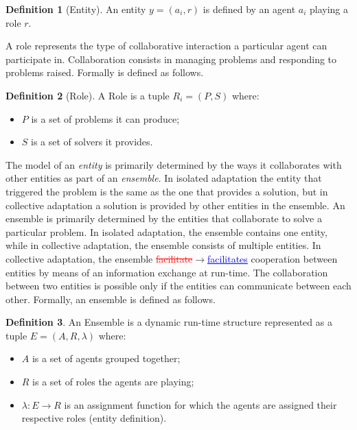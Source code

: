 \documentclass[journal]{IEEEtran}
\theoremstyle{definition}
\newtheorem{definition}{Definition}
\newcommand{\ra}{$\rightarrow$}
\newcommand{\chg}[2]{\textcolor{red}{\sout{#1}}{\ra}\textcolor{blue}{\uline{#2}}} %
\begin{document}
\begin{definition} [Entity] An entity $y = (a_i, r)$ is defined by an agent $a_i$ playing a role $r$.
\end{definition}

A role represents the type of collaborative interaction a particular agent can participate in. Collaboration consists in managing problems and  responding to problems raised. Formally is defined as follows.
 
\begin{definition}[Role] A Role is a tuple $R_i=(P, S)$ where:
\begin{itemize}
\item $P$ is a set of problems it can produce;
\item $S$ is a set of solvers it provides.
\end{itemize}
\end{definition}


The model of an \textit{entity} is primarily determined by the ways it collaborates with other entities as part of an \textit{ensemble}.  In isolated adaptation the entity that triggered the problem is the same as the one that provides a solution, but in collective adaptation a solution is provided by other entities in the ensemble. An ensemble is primarily determined by the entities that collaborate to solve a particular problem. In isolated adaptation, the ensemble contains one entity, while in collective adaptation, the ensemble consists of multiple entities. In collective adaptation, the ensemble \chg{facilitate}{facilitates} cooperation between entities by means of an information exchange at run-time. The collaboration between two entities is possible only if the entities can communicate between each other.
Formally, an ensemble is defined as follows.

\begin{definition}
An Ensemble is a dynamic run-time structure represented as a tuple $E=(A, R, \lambda)$ where:
 \begin{itemize}
\item $A$ is a set of agents grouped together;
\item $R$ is a set of roles the agents are playing;
\item $\lambda: E \rightarrow R $ is an assignment function for which the agents are assigned their respective roles (entity definition).
 \end{itemize}
\end{definition}
\end{document}
